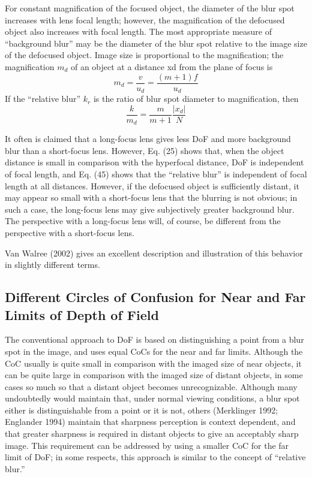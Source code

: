 \documentclass[11pt, oneside]{scrartcl}   	%
\begin{document}
 For constant magnification of the focused object, the diameter of the blur spot increases with lens focal length; however, the magnification of the defocused object also increases with focal length. The most appropriate measure of “background blur” may be the diameter of the blur spot relative to the image size of the defocused object. Image size is proportional to the magnification; the magnification $m_d$ of an object at a distance xd from the plane of focus is
\begin{equation}
   m_d = \frac v {u_d} = \frac{(m+1)f}{u_d} 
   \label{eq:md}
\end{equation}
If the “relative blur” $k_r$ is the ratio of blur spot diameter to magnification, then
\begin{equation}
    \frac k{m_d} = \frac m{m+1}\frac{|x_d|}N
    \label{eq:km}
\end{equation}

It often is claimed that a long-focus lens gives less DoF and more background blur than a short-focus lens. However, Eq. (25) shows that, when the object distance is small in comparison with the hyperfocal distance, DoF is independent of focal length, and Eq. (45) shows that the “relative blur” is independent of focal length at all distances. However, if the defocused object is sufficiently distant, it may appear so small with a short-focus lens that the blurring is not obvious; in such a case, the long-focus lens may give subjectively greater background blur. The perspective with a long-focus lens will, of course, be different from the perspective with a short-focus lens.

Van Walree (2002) gives an excellent description and illustration of this behavior in slightly different terms.

\subsection{Different Circles of Confusion for Near and Far Limits of Depth of Field}

The conventional approach to DoF is based on distinguishing a point from a blur spot in the image, and uses equal CoCs for the near and far limits. Although the CoC usually is quite small in comparison with the imaged size of near objects, it can be quite large in comparison with the imaged size of distant objects, in some cases so much so that a distant object becomes unrecognizable. Although many undoubtedly would maintain that, under normal viewing conditions, a blur spot either is distinguishable from a point or it is not, others (Merklinger 1992; Englander 1994) maintain that sharpness perception is context dependent, and that greater sharpness is required in distant objects to give an acceptably sharp image. This requirement can be addressed by using a smaller CoC for the far limit of DoF; in some respects, this approach is similar to the concept of “relative blur.”
\end{document}
